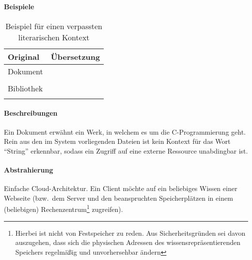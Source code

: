 \paragraph*{Beispiele}
\begin{table}[h!]
    \centering
    \begin{tabularx}{\textwidth}{X X}
        \toprule
            Original & Übersetzung\\
        \midrule
            Dokument & \\
             & \\[2em]
            Bibliothek & \\
             & \\
        \bottomrule
    \end{tabularx}
    \caption{Beispiel für einen verpassten literarischen Kontext}\label{tab:problems:nonexisting}%
\end{table}

\paragraph*{Beschreibungen}
Ein Dokument erwähnt ein Werk, in welchem es um die C-Programmierung geht. Rein aus den im System vorliegenden Dateien ist kein Kontext für das Wort \enquote{String} erkennbar, sodass ein Zugriff auf eine externe Ressource unabdingbar ist.

\paragraph*{Abstrahierung}
Einfache Cloud-Architektur. Ein Client möchte auf ein beliebiges Wissen einer Webseite (bzw.\ dem Server und den beanspruchten Speicherplätzen in einem (beliebigen) Rechenzentrum\footnote{Hierbei ist nicht von Festspeicher zu reden. Aus Sicherheitsgründen sei davon auszugehen, dass sich die physischen Adressen des wissensrepräsentierenden Speichers regelmäßig und unvorhersehbar ändern} zugreifen).




